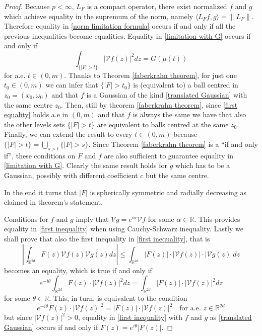 \documentclass[corpo=11pt, stile=classica, tipotesi=custom,
greek, evenboxes, english]{toptesi}
\numberwithin{equation}{chapter}
\theoremstyle{remark}
\newcommand{\R}{\mathbb{R}} %
\newcommand{\V}{\mathcal{V}} %
\begin{document}
\begin{proof}
	{\color{red} Because $p<\infty$, $L_F$ is a compact operator}, there exist normalized $f$ and $g$ which achieve equality in the supremum of the norm, namely $\langle L_F f, g \rangle = \| L_F \|$. Therefore equality in \eqref{norm limitation formula} occurs if and only if all the previous inequalities become equalities. Equality in \eqref{limitation with G} occurs if and only if
	\begin{equation}\label{first equality}
		\int_{\{|F|>t\}} |\V f(z)|^2 dz = G(\mu(t))
	\end{equation}
	for a.e. $t \in (0,m)$. Thanks to Theorem \ref{faberkrahn theorem}, for just one $t_0 \in (0,m)$ we can infer that $\{|F|>t_0\}$ is (equivalent to) a ball centred in $z_0 = (x_0,\omega_0)$ and that $f$ is a Gaussian of the kind \eqref{translated Gaussian} with the same centre $z_0$. Then, still by theorem \ref{faberkrahn theorem}, since \eqref{first equality} holds a.e in $(0,m)$ and that $f$ is always the same we have that also the other levels sets $\{|F|>t\}$ are equivalent to balls centred at the same $z_0$. Finally, we can extend the result to every $t \in (0,m)$ because $\{|F|>t\} = \bigcup_{s > t} \{|F|>s\}$. Since Theorem \ref{faberkrahn theorem} is a ``if and only if'', these conditions on $F$ and $f$ are also sufficient to guarantee equality in \eqref{limitation with G}. Clearly the same result holds for $g$ which has to be a Gaussian, possibly with different coefficient $c$ but the same centre.
	
	In the end it turns that $|F|$ is spherically symmetric and radially decreasing as claimed in theorem's statement.
	
	Conditions for $f$ and $g$ imply that $\V g  = e^{i \alpha} \V f$ for some $\alpha \in \R$. This provides equality in \eqref{first inequality} when using Cauchy-Schwarz inequality. Lastly we shall prove that also the first inequality in \eqref{first inequality}, that is
	\begin{equation*}
		\left\vert \int_{\R^{2d}} F(z) \V f(z) \overline{\V g(z)} dz \right\vert \leq \int_{\R^{2d}} |F(z)| \cdot | \V f(z)| \cdot |\V g(z)| dz
	\end{equation*}
	becomes an equality, which is true if and only if
	\begin{equation*}
		e^{-i\theta}  \int_{\R^{2d}} F(z) \cdot |\V f(z)|^2 dz = \int_{\R^{2d}} |F(z)| \cdot | \V f(z)|^2 dz
	\end{equation*}
	for some $\theta \in \R$. This, in turn, is equivalent to the condition
	\begin{equation*}
		e^{-i \theta}F(z) \cdot |\V f(z)|^2 = |F(z)| \cdot |\V f(z)|^2 \quad \text{for a.e. } z \in \R^{2d}
	\end{equation*}
	but since $|\V f(z)|^2 > 0$, equality in \ref{first inequality} with $f$ and $g$ as \eqref{translated Gaussian} occurs if and only if $F(z) = e^{i \theta} |F(z)|$.
\end{proof}
\end{document}

